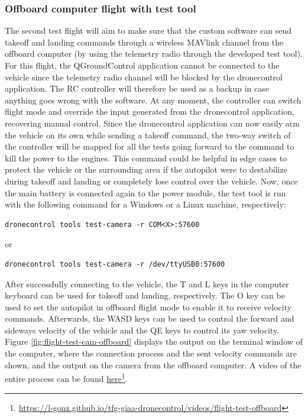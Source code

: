 \subsubsection{Offboard computer flight with test tool}
\label{subsec:fl-test-2}

The second test flight will aim to make sure that the custom software can send takeoff and landing commands through a wireless MAVlink channel from the offboard computer (by using the telemetry radio through the developed test tool).
For this flight, the QGroundControl application cannot be connected to the vehicle since the telemetry radio channel will be blocked by the dronecontrol application.
The RC controller will therefore be used as a backup in case anything goes wrong with the software.
At any moment, the controller can switch flight mode and override the input generated from the dronecontrol application, recovering manual control.
Since the dronecontrol application can now easily arm the vehicle on its own while sending a takeoff command,
the two-way switch of the controller will be mapped for all the tests going forward to the command to kill the power to the engines.
This command could be helpful in edge cases to protect the vehicle or the surrounding area if the autopilot were to destabilize during takeoff and landing or completely lose control over the vehicle.
Now, once the main battery is connected again to the power module, the test tool is run with the following command for a Windows or a Linux machine, respectively:
\begin{verbatim}
dronecontrol tools test-camera -r COM<X>:57600
\end{verbatim}
or
\begin{verbatim}
dronecontrol tools test-camera -r /dev/ttyUSB0:57600
\end{verbatim}

After successfully connecting to the vehicle, the T and L keys in the computer keyboard can be used for takeoff and landing, respectively. The O key can be used to set the autopilot in offboard flight mode to enable it to receive velocity commands.
Afterwards, the WASD keys can be used to control the forward and sideways velocity of the vehicle and the QE keys to control its yaw velocity.
Figure \ref{fig:flight-test-cam-offboard} displays the output on the terminal window of the computer, where the connection process and the sent velocity commands are shown, and the output on the camera from the offboard computer.
A video of the entire process can be found \href{https://l-gonz.github.io/tfg-giaa-dronecontrol/videos/flight-test-offboard}{here}\footnote{\url{https://l-gonz.github.io/tfg-giaa-dronecontrol/videos/flight-test-offboard}}.

